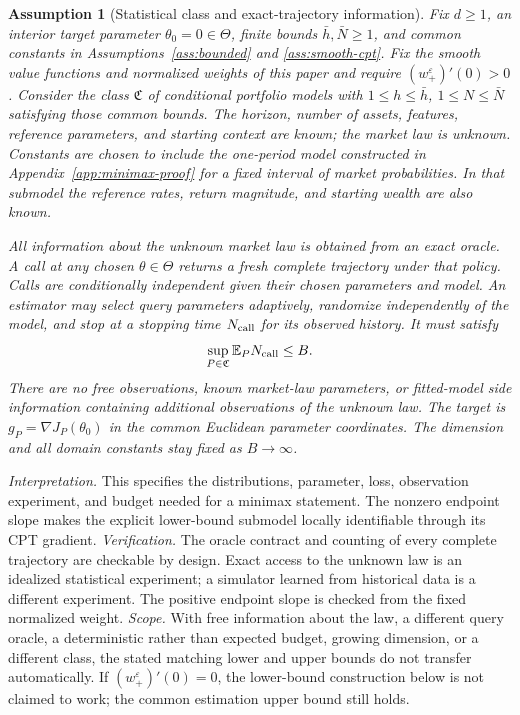 \documentclass[11pt]{article}
\newtheorem{assumption}[theorem]{Assumption}
\newcommand{\E}{\mathbb E}
\newcommand{\1}{\mathbf 1}
\newcommand{\eps}{\varepsilon}
\newcommand{\assess}[3]{\par\noindent\emph{Interpretation.} #1 \emph{Verification.} #2 \emph{Scope.} #3\par}
\begin{document}
\begin{assumption}[Statistical class and exact-trajectory information]\label{ass:oracle}
Fix $d\ge1$, an interior target parameter $\theta_0=0\in\Theta$, finite bounds $\bar h,\bar N\ge1$, and common constants in Assumptions~\ref{ass:bounded} and \ref{ass:smooth-cpt}. Fix the smooth value functions and normalized weights of this paper and require $(w_+^\eps)'(0)>0$. Consider the class $\mathfrak C$ of conditional portfolio models with $1\le h\le\bar h$, $1\le N\le\bar N$ satisfying those common bounds. The horizon, number of assets, features, reference parameters, and starting context are known; the market law is unknown. Constants are chosen to include the one-period model constructed in Appendix~\ref{app:minimax-proof} for a fixed interval of market probabilities. In that submodel the reference rates, return magnitude, and starting wealth are also known.

All information about the unknown market law is obtained from an exact oracle. A call at any chosen $\theta\in\Theta$ returns a fresh complete trajectory under that policy. Calls are conditionally independent given their chosen parameters and model. An estimator may select query parameters adaptively, randomize independently of the model, and stop at a stopping time $N_{\rm call}$ for its observed history. It must satisfy
\[
 \sup_{P\in\mathfrak C}\E_P N_{\rm call}\le B.
\]
There are no free observations, known market-law parameters, or fitted-model side information containing additional observations of the unknown law. The target is $g_P=\nabla J_P(\theta_0)$ in the common Euclidean parameter coordinates. The dimension and all domain constants stay fixed as $B\to\infty$.
\end{assumption}
\assess{This specifies the distributions, parameter, loss, observation experiment, and budget needed for a minimax statement. The nonzero endpoint slope makes the explicit lower-bound submodel locally identifiable through its CPT gradient.}{The oracle contract and counting of every complete trajectory are checkable by design. Exact access to the unknown law is an idealized statistical experiment; a simulator learned from historical data is a different experiment. The positive endpoint slope is checked from the fixed normalized weight.}{With free information about the law, a different query oracle, a deterministic rather than expected budget, growing dimension, or a different class, the stated matching lower and upper bounds do not transfer automatically. If $(w_+^\eps)'(0)=0$, the lower-bound construction below is not claimed to work; the common estimation upper bound still holds.}
\end{document}

